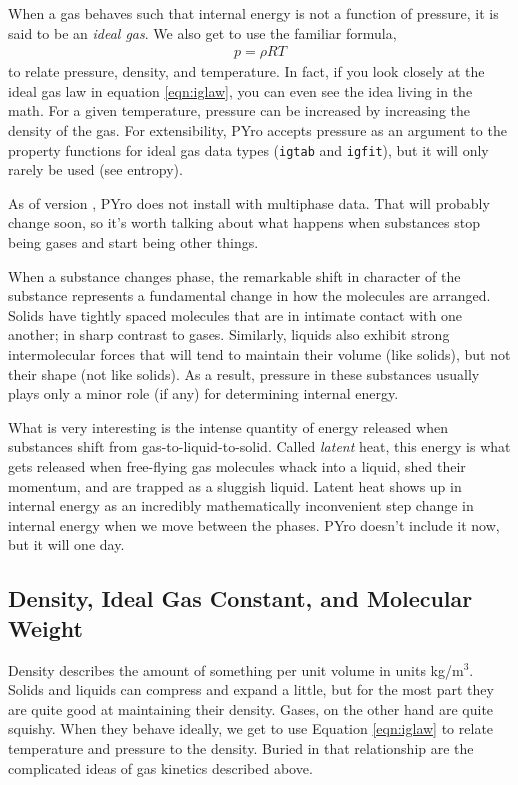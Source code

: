 When a gas behaves such that internal energy is not a function of pressure, it is said to be an \emph{ideal gas}.  We also get to use the familiar formula,
\begin{align}
p = \rho R T\label{eqn:iglaw}
\end{align}
to relate pressure, density, and temperature.  In fact, if you look closely at the ideal gas law in equation \ref{eqn:iglaw}, you can even see the idea living in the math.  For a given temperature, pressure can be increased by increasing the density of the gas.  For extensibility, PYro accepts pressure as an argument to the property functions for ideal gas data types (\verb|igtab| and \verb|igfit|), but it will only rarely be used (see entropy).

As of version \version{}, PYro does not install with multiphase data.  That will probably change soon, so it's worth talking about what happens when substances stop being gases and start being other things.

When a substance changes phase, the remarkable shift in character of the substance represents a fundamental change in how the molecules are arranged.  Solids have tightly spaced molecules that are in intimate contact with one another; in sharp contrast to gases.  Similarly, liquids also exhibit strong intermolecular forces that will tend to maintain their volume (like solids), but not their shape (not like solids).  As a result, pressure in these substances usually plays only a minor role (if any) for determining internal energy.  

What is very interesting is the intense quantity of energy released when substances shift from gas-to-liquid-to-solid.  Called \emph{latent} heat, this energy is what gets released when free-flying gas molecules whack into a liquid, shed their momentum, and are trapped as a sluggish liquid.  Latent heat shows up in internal energy as an incredibly mathematically inconvenient step change in internal energy when we move between the phases.  PYro doesn't include it now, but it will one day.

\subsection{Density, Ideal Gas Constant, and Molecular Weight}
Density describes the amount of something per unit volume in units kg/m$^3$.  Solids and liquids can compress and expand a little, but for the most part they are quite good at maintaining their density.  Gases, on the other hand are quite squishy.  When they behave ideally, we get to use Equation \ref{eqn:iglaw} to relate temperature and pressure to the density.  Buried in that relationship are the complicated ideas of gas kinetics described above.

